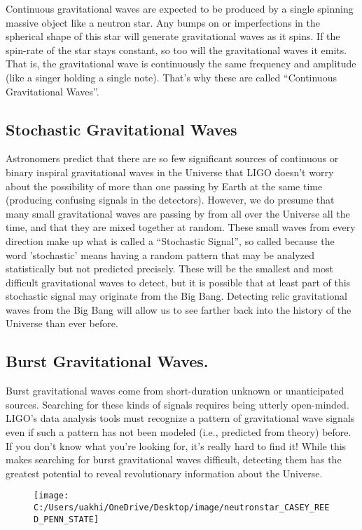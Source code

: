 Continuous gravitational waves are expected to be produced by a single spinning massive object like a neutron star. Any bumps on or imperfections in the spherical shape of this star will generate gravitational waves as it spins. If the spin-rate of the star stays constant, so too will the gravitational waves it emits. That is, the gravitational wave is continuously the same frequency and amplitude (like a singer holding a single note). That's why these are called “Continuous Gravitational Waves”.


\subsection{Stochastic Gravitational Waves}

Astronomers predict that there are so few significant sources of continuous or binary inspiral gravitational waves in the Universe that LIGO doesn't worry about the possibility of more than one passing by Earth at the same time (producing confusing signals in the detectors). However, we do presume that many small gravitational waves are passing by from all over the Universe all the time, and that they are mixed together at random. These small waves from every direction make up what is called a “Stochastic Signal”, so called because the word 'stochastic' means having a random pattern that may be analyzed statistically but not predicted precisely. These will be the smallest and most difficult gravitational waves to detect, but it is possible that at least part of this stochastic signal may originate from the Big Bang. Detecting relic gravitational waves from the Big Bang will allow us to see farther back into the history of the Universe than ever before.
\subsection{Burst Gravitational Waves.}
Burst gravitational waves come from short-duration unknown or unanticipated sources. Searching for these kinds of signals requires being utterly open-minded. LIGO's data analysis tools must recognize a pattern of gravitational wave signals even if such a pattern has not been modeled (i.e., predicted from theory) before. If you don’t know what you’re looking for, it’s really hard to find it! While this makes searching for burst gravitational waves difficult, detecting them has the greatest potential to reveal revolutionary information about the Universe.

\begin{figure}
	\centering
	\texttt{[image: C:/Users/uakhi/OneDrive/Desktop/image/neutronstar\_CASEY\_REED\_PENN\_STATE]}
	\caption{}
	\label{fig:neutronstarcaseyreedpennstate}
\end{figure}


